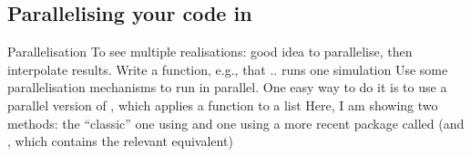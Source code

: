 \documentclass[aspectratio=169]{beamer}
\begin{document}



\subsection{Parallelising your code in }


\begin{frame}{Parallelisation}
    To see multiple realisations: good idea to parallelise, then interpolate results. Write a function, e.g.,   that .. runs one simulation
    \vfill
    Use some parallelisation mechanisms to run  in parallel. One easy way to do it is to use a parallel version of , which applies a function to a list
    \vfill
    Here, I am showing two methods: the ``classic'' one using  and one using a more recent package called  (and , which contains the relevant  equivalent)
\end{frame}
\end{document}
